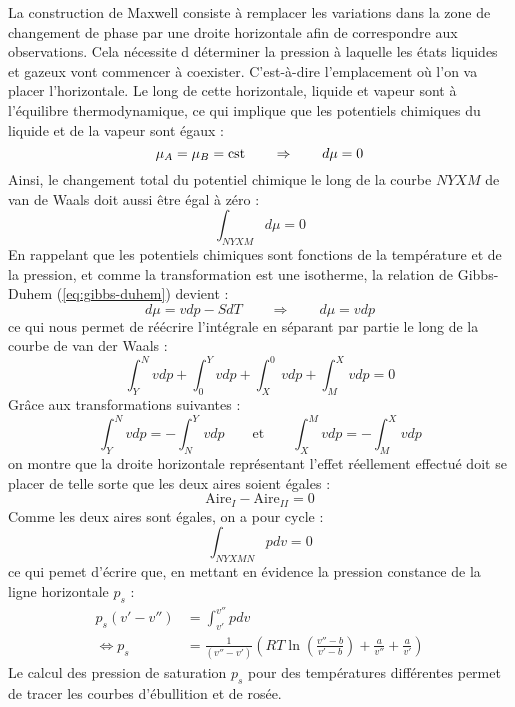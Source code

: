 La construction de Maxwell consiste à remplacer les variations dans la zone de changement de phase par une droite horizontale afin de correspondre aux observations. Cela nécessite d déterminer la pression à laquelle les états liquides et gazeux vont commencer à coexister. C'est-à-dire l'emplacement où l'on va placer l'horizontale. Le long de cette horizontale, liquide et vapeur sont à l'équilibre thermodynamique, ce qui implique que les potentiels chimiques du liquide et de la vapeur sont égaux :
\begin{equation} \mu_A = \mu_B = \mathrm{cst} \qquad \Rightarrow \qquad d\mu = 0 \end{equation}
Ainsi, le changement total du potentiel chimique le long de la courbe $NYXM$ de van de Waals doit aussi être égal à zéro :
\begin{equation} \int_{NYXM}d\mu = 0 \end{equation}
En rappelant que les potentiels chimiques sont fonctions de la température et de la pression, et comme la transformation est une isotherme, la relation de Gibbs-Duhem (\ref{eq:gibbs-duhem}) devient :
\begin{equation} d\mu = vdp - SdT \qquad \Rightarrow \qquad d\mu = vdp \end{equation}
ce qui nous permet de réécrire l'intégrale en séparant par partie le long de la courbe de van der Waals :
\begin{equation} \int_Y^Nvdp + \int_0^Yvdp + \int_X^0vdp + \int_M^Xvdp = 0 \end{equation}
Grâce aux transformations suivantes :
\begin{equation} \int_Y^Nvdp = -\int_N^Yvdp \qquad \text{et} \qquad \int_X^Mvdp = -\int_M^Xvdp \end{equation}
on montre que la droite horizontale représentant l'effet réellement effectué doit se placer de telle sorte que les deux aires soient égales :
\begin{equation} \text{Aire}_{I} - \text{Aire}_{II} = 0 \end{equation}
Comme les deux aires sont égales, on a pour cycle :
\begin{equation} \int_{NYXMN}pdv = 0 \end{equation}
ce qui pemet d'écrire que, en mettant en évidence la pression constance de la ligne horizontale $p_s$ :
\begin{align} p_s(v'-v'') &= \int_{v'}^{v''}pdv \\ \Leftrightarrow p_s &= \frac{1}{(v''-v')}\left(RT\ln\left(\frac{v''-b}{v'-b}\right) + \frac{a}{v''} + \frac{a}{v'}\right) \end{align}
Le calcul des pression de saturation $p_s$ pour des températures différentes permet de tracer les courbes d'ébullition et de rosée. 

